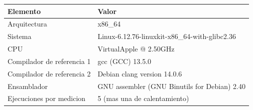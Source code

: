 \begin{tabular}{ll}\toprule
Elemento & Valor \\\midrule
Arquitectura & x86\_64 \\
Sistema & Linux-6.12.76-linuxkit-x86\_64-with-glibc2.36 \\
CPU & VirtualApple @ 2.50GHz \\
Compilador de referencia 1 & gcc (GCC) 13.5.0 \\
Compilador de referencia 2 & Debian clang version 14.0.6 \\
Ensamblador & GNU assembler (GNU Binutils for Debian) 2.40 \\
Ejecuciones por medicion & 5 (mas una de calentamiento) \\
\bottomrule\end{tabular}
